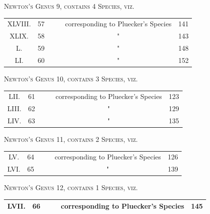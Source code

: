 \documentclass[11pt,a4paper]{article}
\theoremstyle{plain}
\begin{document}
\begin{center}
\textsc{Newton's Genus 9, contains 4 Species, viz.}
\end{center}
\begin{center}
\begin{tabular}{cccccc}
\toprule
XLVIII. & 57 & & & corresponding to Pluecker's Species & 141 \\
XLIX. & 58 & & & " & 143 \\
L. & 59 & & & " & 148 \\
LI. & 60 & & & " & 152 \\
\bottomrule
\end{tabular}
\end{center}

\begin{center}
\textsc{Newton's Genus 10, contains 3 Species, viz.}
\end{center}
\begin{center}
\begin{tabular}{cccccc}
\toprule
LII. & 61 & & & corresponding to Pluecker's Species & 123 \\
LIII. & 62 & & & " & 129 \\
LIV. & 63 & & & " & 135 \\
\bottomrule
\end{tabular}
\end{center}

\begin{center}
\textsc{Newton's Genus 11, contains 2 Species, viz.}
\end{center}
\begin{center}
\begin{tabular}{cccccc}
\toprule
LV. & 64 & & & corresponding to Pluecker's Species & 126 \\
LVI. & 65 & & & " & 139 \\
\bottomrule
\end{tabular}
\end{center}

\begin{center}
\textsc{Newton's Genus 12, contains 1 Species, viz.}
\end{center}
\begin{center}
\begin{tabular}{cccccc}
\toprule
LVII. & 66 & & & corresponding to Pluecker's Species & 145 \\
\bottomrule
\end{tabular}
\end{center}
\end{document}
